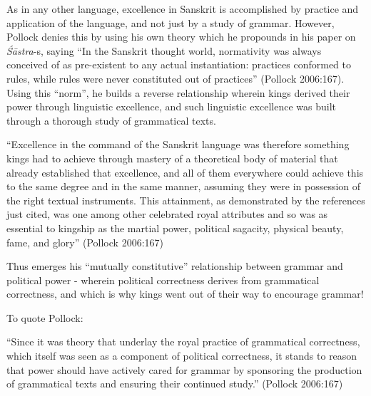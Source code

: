 As in any other language, excellence in Sanskrit is accomplished by practice and application of the language, and not just by a study of grammar. However, Pollock denies this by using his own theory which he propounds in his paper on {\sl Śāstra}-s, saying ``In the Sanskrit thought world, normativity was always conceived of as pre-existent to any actual instantiation: practices conformed to rules, while rules were never constituted out of practices'' (Pollock 2006:167). Using this ``norm'', he builds a reverse relationship wherein kings derived their power through linguistic excellence, and such linguistic excellence was built through a thorough study of grammatical texts.
\begin{myquote}
``Excellence in the command of the Sanskrit language was therefore something kings had to achieve through mastery of a theoretical body of material that already established that excellence, and all of them everywhere could achieve this to the same degree and in the same manner, assuming they were in possession of the right textual instruments. This attainment, as demonstrated by the references just cited, was one among other celebrated royal attributes and so was as essential to kingship as the martial power, political sagacity, physical beauty, fame, and glory''
\hfill (Pollock 2006:167)
\end{myquote}

Thus emerges his ``mutually constitutive'' relationship between grammar and political power - wherein political correctness derives from grammatical correctness, and which is why kings went out of their way to encourage grammar! 

To quote Pollock:
\begin{myquote}
``Since it was theory that underlay the royal practice of grammatical correctness, which itself was seen as a component of political correctness, it stands to reason that power should have actively cared for grammar by sponsoring the production of grammatical texts and ensuring their continued study.''
\hfill (Pollock 2006:167)
\end{myquote}

